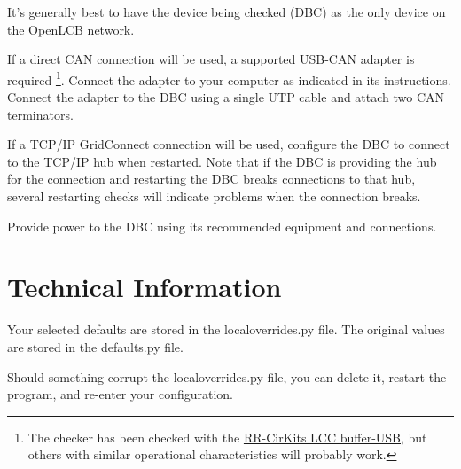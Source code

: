 \documentclass[11pt]{article}
\begin{document}
It's generally best to have the device being checked (DBC) 
as the only device on the OpenLCB network. 

If a direct CAN connection will be used,
a supported USB-CAN adapter is required
\footnote{The checker has been checked with the
\href{https://www.rr-cirkits.com/description/LCC-usb-flyer.pdf}{RR-CirKits LCC buffer-USB},
but others with similar operational characteristics will probably work.
}. 
Connect the adapter to your computer as indicated in its instructions.
Connect the adapter to the DBC using a single UTP cable
and attach two CAN terminators.

If a TCP/IP GridConnect connection will be used, 
configure the DBC to connect to the TCP/IP hub when restarted. Note that if 
the DBC is providing the hub for the connection and restarting the DBC
breaks connections to that hub, several restarting checks will indicate problems
when the connection breaks.

Provide power to the DBC using its recommended equipment and connections.


\section{Technical Information}

Your selected defaults are stored in the localoverrides.py file.
The original values are stored in the defaults.py file.

Should something corrupt the localoverrides.py file,
you can delete it, restart the program, and re-enter your configuration.
\end{document}
